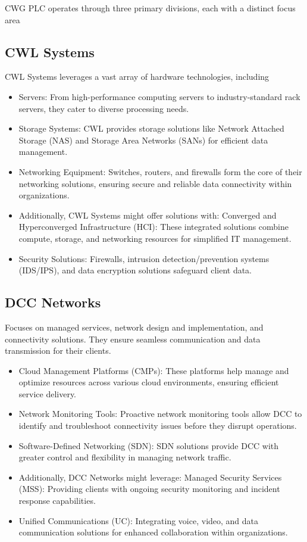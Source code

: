 \documentclass[a4paper,12pt]{report}
\begin{document}
	CWG PLC operates through three primary divisions, each with a distinct focus area
	
	\subsection{CWL Systems}
	CWL Systems leverages a vast array of hardware technologies, including
	\begin{itemize}
		\item Servers: From high-performance computing servers to industry-standard rack servers, they cater to diverse processing needs.
		
		\item Storage Systems: CWL provides storage solutions like Network Attached Storage (NAS) and Storage Area Networks (SANs) for efficient data management.
		
		\item Networking Equipment: Switches, routers, and firewalls form the core of their networking solutions, ensuring secure and reliable data connectivity within organizations.
		
		\item Additionally, CWL Systems might offer solutions with:
		Converged and Hyperconverged Infrastructure (HCI): These integrated solutions combine compute, storage, and networking resources for simplified IT management.
		
		\item Security Solutions: Firewalls, intrusion detection/prevention systems (IDS/IPS), and data encryption solutions safeguard client data.
	\end{itemize}
	
	\subsection{DCC Networks}
	Focuses on managed services, network design and implementation, and connectivity solutions. They ensure seamless communication and data transmission for their clients.
	\begin{itemize}
		\item Cloud Management Platforms (CMPs): These platforms help manage and optimize resources across various cloud environments, ensuring efficient service delivery.
		
		\item Network Monitoring Tools: Proactive network monitoring tools allow DCC to identify and troubleshoot connectivity issues before they disrupt operations.
		
		\item Software-Defined Networking (SDN): SDN solutions provide DCC with greater control and flexibility in managing network traffic.
		
		\item Additionally, DCC Networks might leverage:
		Managed Security Services (MSS): Providing clients with ongoing security monitoring and incident response capabilities.
		
		\item Unified Communications (UC): Integrating voice, video, and data communication solutions for enhanced collaboration within organizations.
	\end{itemize}
	
\end{document}
